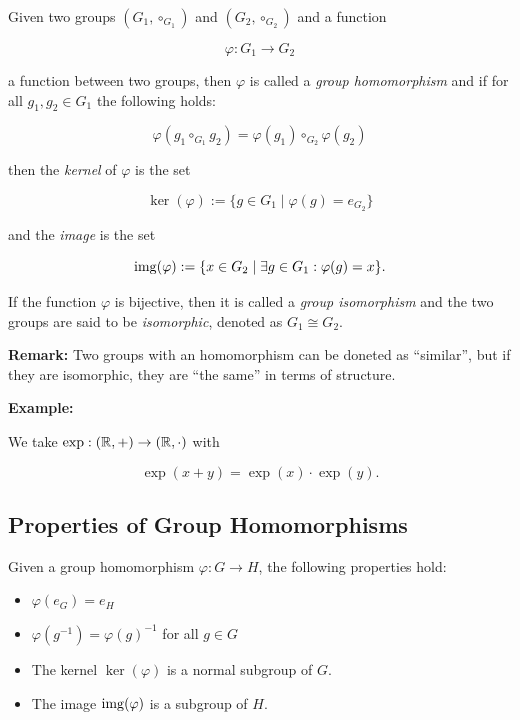 Given two groups \((G_1, \circ_{G_1})\) and \((G_2, \circ_{G_2})\) and a function

\[
	\varphi: G_1 \to G_2
\]

a function between two groups, then \(\varphi\) is called a \emph{group homomorphism} and if for all
\(g_1, g_2 \in G_1\) the following holds:

\[
	\varphi(g_1 \circ_{G_1} g_2) = \varphi(g_1) \circ_{G_2} \varphi (g_2)
\]

then the \emph{kernel} of \(\varphi\) is the set

\[
	\ker (\varphi) := \{g \in G_1 \mid \varphi(g) = e_{G_2}\}
\]

and the \emph{image} is the set

\[
	\mathrm{img} (\varphi) := \{x \in G_2 \mid \exists g \in G_1: \varphi(g) = x\}.
\]

If the function \(\varphi\) is bijective, then it is called a \emph{group isomorphism} and the two groups are said to be \emph{isomorphic}, denoted as \(G_1 \cong G_2\).

\textbf{Remark:} Two groups with an homomorphism can be doneted as ``similar'', but if they are isomorphic, they are ``the same'' in terms of structure.

\textbf{Example:}

We take \(\exp: (\mathbb{R}, +) \to (\mathbb{R}, \cdot)\) with

\[
	\exp(x + y) = \exp(x) \cdot \exp(y).
\]

\subsection{Properties of Group Homomorphisms}

Given a group homomorphism \(\varphi: G \to H\), the following properties hold:

\begin{itemize}

	\item \(\varphi(e_G) = e_H\)

	\item \(\varphi(g^{-1}) = \varphi(g)^{-1}\) for all \(g \in G\)

	\item The kernel \(\ker(\varphi)\) is a normal subgroup of \(G\).

	\item The image \(\mathrm{img}(\varphi)\) is a subgroup of \(H\).

\end{itemize}

